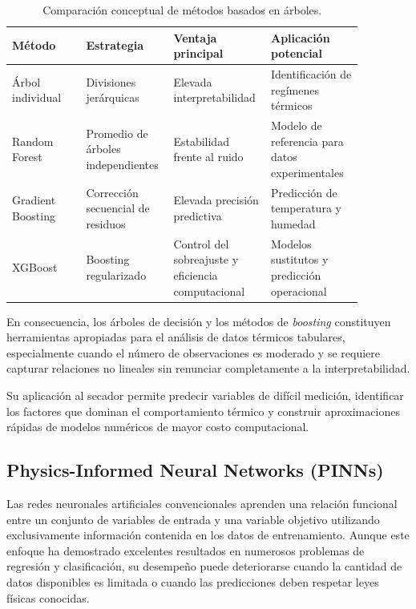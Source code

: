 \begin{table}[H]
\centering
\caption{Comparación conceptual de métodos basados en árboles.}
\label{tab:comparacion_arboles}
\begin{tabular}{
p{0.20\linewidth}
p{0.20\linewidth}
p{0.22\linewidth}
p{0.25\linewidth}
}
\toprule
Método
&
Estrategia
&
Ventaja principal
&
Aplicación potencial
\\
\midrule

Árbol individual
&
Divisiones jerárquicas
&
Elevada interpretabilidad
&
Identificación de regímenes térmicos
\\[0.2cm]

Random Forest
&
Promedio de árboles independientes
&
Estabilidad frente al ruido
&
Modelo de referencia para datos experimentales
\\[0.2cm]

Gradient Boosting
&
Corrección secuencial de residuos
&
Elevada precisión predictiva
&
Predicción de temperatura y humedad
\\[0.2cm]

XGBoost
&
Boosting regularizado
&
Control del sobreajuste y eficiencia computacional
&
Modelos sustitutos y predicción operacional
\\
\bottomrule
\end{tabular}
\end{table}

En consecuencia, los árboles de decisión y los métodos de \textit{boosting} constituyen herramientas apropiadas para el análisis de datos térmicos tabulares, especialmente cuando el número de observaciones es moderado y se requiere capturar relaciones no lineales sin renunciar completamente a la interpretabilidad.

Su aplicación al secador permite predecir variables de difícil medición, identificar los factores que dominan el comportamiento térmico y construir aproximaciones rápidas de modelos numéricos de mayor costo computacional.



\subsection{Physics-Informed Neural Networks (PINNs)}
\label{subsec:pinn}

Las redes neuronales artificiales convencionales aprenden una relación funcional entre un conjunto de variables de entrada y una variable objetivo utilizando exclusivamente información contenida en los datos de entrenamiento. Aunque este enfoque ha demostrado excelentes resultados en numerosos problemas de regresión y clasificación, su desempeño puede deteriorarse cuando la cantidad de datos disponibles es limitada o cuando las predicciones deben respetar leyes físicas conocidas.

